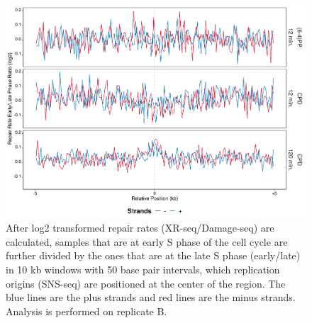 \begin{figure}[H]
\begin{center}
\includegraphics[width=\textwidth]{Chapters/7_appendix/figures/supfig55}
\caption[Repair rate early/late ratio of replication origins in 10 kb (replicate B).]{After log2 transformed repair rates (XR-seq/Damage-seq) are calculated, samples that are at early S phase of the cell cycle are further divided by the ones that are at the late S phase (early/late) in 10 kb windows with 50 base pair intervals, which replication origins (SNS-seq) are positioned at the center of the region. The blue lines are the plus strands and red lines are the minus strands. Analysis is performed on replicate B.}
\label{supfig:rrel10snsB}
\end{center}
\end{figure}

